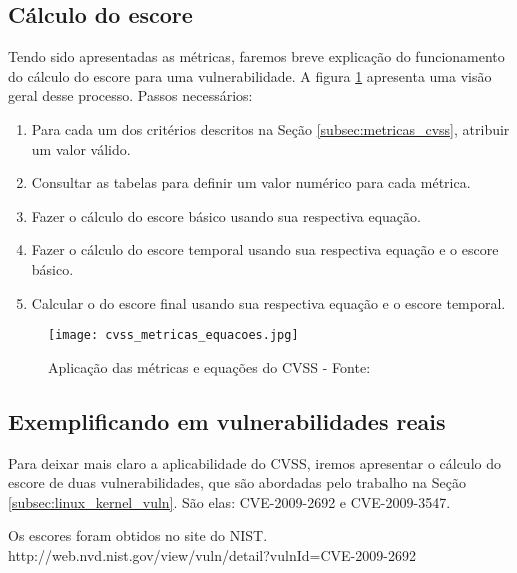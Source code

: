 		\subsection{Cálculo do escore}
			Tendo sido apresentadas as métricas, faremos breve explicação
			do funcionamento do cálculo do escore para uma vulnerabilidade.
			A figura \ref{fig:cvss_metricas_equacoes} apresenta uma visão geral desse processo. 
			Passos necessários:
			\begin{enumerate}
				\item{Para cada um dos critérios descritos na Seção \ref{subsec:metricas_cvss},
					atribuir um valor válido.}
				\item{Consultar as tabelas para definir um valor numérico para cada métrica.}
				\item{Fazer o cálculo do escore básico usando sua respectiva equação.}
				\item{Fazer o cálculo do escore temporal usando sua respectiva equação e o escore básico.}
				\item{Calcular o do escore final usando sua respectiva equação e o escore temporal.}
			\end{enumerate}
			

			\begin{figure}
				\begin{center}
					\texttt{[image: cvss\_metricas\_equacoes.jpg]}
					\caption{Aplicação das métricas e equações do CVSS - Fonte: \cite{Mell2007}}
					\label{fig:cvss_metricas_equacoes}
				\end{center}
			\end{figure}



		\subsection{Exemplificando em vulnerabilidades reais}
			Para deixar mais claro a aplicabilidade do CVSS, iremos apresentar o
			cálculo do escore de duas vulnerabilidades, que são abordadas pelo trabalho
			na Seção \ref{subsec:linux_kernel_vuln}.
			São elas: CVE-2009-2692 e CVE-2009-3547.


			Os escores foram obtidos no site do NIST.
			http://web.nvd.nist.gov/view/vuln/detail?vulnId=CVE-2009-2692
			

